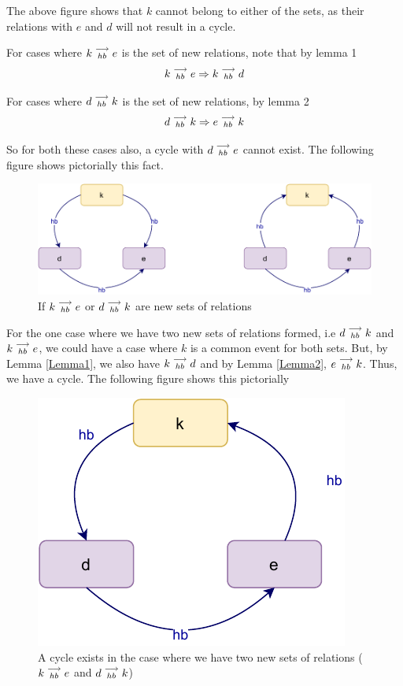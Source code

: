     The above figure shows that $k$ cannot belong to either of the sets, as their relations with $e$ and $d$ will not result in a cycle. 

    For cases where $k\stackrel{\longrightarrow}{_{hb}}e$ is the set of new relations, note that by lemma 1
    \[
        k\stackrel{\longrightarrow}{_{hb}}e \Rightarrow k\stackrel{\longrightarrow}{_{hb}}d
    \]

    For cases where $d\stackrel{\longrightarrow}{_{hb}}k$ is the set of new relations, by lemma 2
    \[
        d\stackrel{\longrightarrow}{_{hb}}k \Rightarrow e\stackrel{\longrightarrow}{_{hb}}k
    \]

    So for both these cases also, a cycle with $d\stackrel{\longrightarrow}{_{hb}}e$ cannot exist. The following figure shows pictorially this fact. 
    \begin{figure}[H]
        \centering
        \includegraphics[scale=0.7]{5.InstructionReordering/4.ValidReorderingCandidate/ProofParts/Part3/part3(c).pdf}
        \caption{If $k\stackrel{\longrightarrow}{_{hb}}e$ or $d\stackrel{\longrightarrow}{_{hb}}k$ are new sets of relations}
        \label{fig:my_label}
    \end{figure}

    For the one case where we have two new sets of relations formed, i.e $d\stackrel{\longrightarrow}{_{hb}}k$ and $k\stackrel{\longrightarrow}{_{hb}}e$, we could have a case where $k$ is a common event for both sets. But, by Lemma \ref{Lemma1}, we also have $k\stackrel{\longrightarrow}{_{hb}}d$ and by Lemma \ref{Lemma2}, $e\stackrel{\longrightarrow}{_{hb}}k$\footnotemark. Thus, we have a cycle. The following figure shows this pictorially

    \begin{figure}[H]
        \centering
        \includegraphics[scale=0.7]{5.InstructionReordering/4.ValidReorderingCandidate/ProofParts/Part3/part3(d).pdf}
        \caption{A cycle exists in the case where we have two new sets of relations ($k\stackrel{\longrightarrow}{_{hb}}e$ and $d\stackrel{\longrightarrow}{_{hb}}k$) }
        \label{fig:my_label}
    \end{figure}


